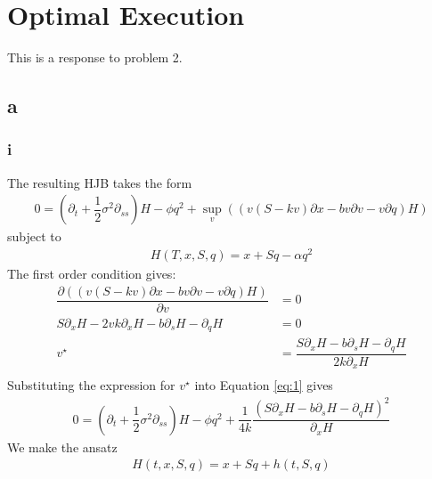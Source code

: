 \documentclass{article}
\begin{document}
\section{Optimal Execution}
This is a response to problem 2.
\subsection*{a}
\subsubsection*{i}
The resulting HJB takes the form 
\begin{equation}
    \begin{split}
        0 = (\partial_t +\dfrac{1}{2} \sigma^2\partial_{ss})H - \phi q^2 + \sup_{v}((v(S-kv)\partial x - bv\partial v - v \partial q)H)\label{eq:1}
    \end{split}
\end{equation}
subject to 
\begin{equation*}
    \begin{split}
        H(T,x,S,q) = x + Sq - \alpha q^2
    \end{split}
\end{equation*}
The first order condition gives: 
\begin{equation*}
    \begin{split}
       \dfrac{\partial((v(S-kv)\partial x - bv\partial v - v \partial q)H)}{\partial v} &=0\\
       S\partial_{x}H - 2vk\partial_{x}H - b\partial_{s}H - \partial_{q}H &=0\\
       v^{\star} &= \dfrac{S\partial_{x}H - b\partial_{s}H - \partial_{q}H}{2k\partial_{x}H}\\
    \end{split}
\end{equation*}
Substituting the expression for $v^{\star}$ into Equation \eqref{eq:1} gives 
\begin{equation}
    \begin{split}
        0 = (\partial_t +\dfrac{1}{2} \sigma^2\partial_{ss})H - \phi q^2 + \dfrac{1}{4k}\dfrac{(S\partial_{x}H - b\partial_{s}H - \partial_{q}H)^2}{\partial_{x}H}\label{eq:2}
    \end{split}
\end{equation}
We make the ansatz
\begin{equation*}
    \begin{split}
       H(t,x,S,q) = x + Sq + h(t,S,q)
    \end{split}
\end{equation*}
\end{document}
